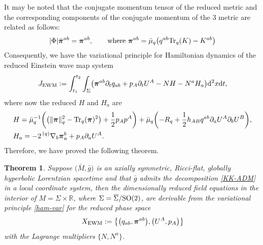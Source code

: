 \documentclass[11pt]{article}
\numberwithin{equation}{section}
\def\ptl{\partial}%
\def\mbo#1{\boldsymbol{#1}}%
\def\olin#1{\overline{#1}{}}%
\def\grad{{\nabla}}%
\newcommand{\leftexp}[2]{{\vphantom{#2}}^{#1}{#2}}
\def\halb{\frac{1}{2}}%
\numberwithin{equation}{section}
\newtheorem{Theorem}{Theorem}[section]
\begin{document}
It may be noted that the conjugate momentum tensor of the reduced metric and the corresponding components of the conjugate momentum of the $3$ metric are related as follows:
\begin{align*}
 \vert \Phi \vert \bar{\mbo{\pi}}^{ab} = \mbo{\pi}^{ab}, \qquad \text{where} \ \mbo{\pi}^{ab} = \bar{\mu}_q \bigl(q^{ab} {\rm Tr}_q(K) - K^{ab} \bigr)
\end{align*}
Consequently, we have the variational principle for Hamiltonian dynamics of the reduced Einstein wave map system
\begin{align} \label{ham-var}
J_{{\rm EWM}} := \int^{t_2}_{t_1}\int_{\Sigma} \bigl(\mbo{\pi}^{ab} \ptl_t q_{ab} + p_A \ptl_t U^A - N H - N^a H_a \bigr) {\rm d}^2x {\rm d}t,
\end{align}
where now the reduced $H$ and $H_a$ are
\begin{align*}
&H= \bar{\mu}^{-1}_q \biggl(\bigl(\Vert \mbo{\pi} \Vert^2_q - {\rm Tr}_q (\mbo{\pi})^2 \bigr) + \halb p_A p^A \biggr) + \bar{\mu}_q \biggl(- R_q + \halb h_{AB} q^{ab} \ptl_a U^A \ptl_b U^B \biggr), \\
&H_a= - 2\, \leftexp{(q)}{\grad}_b \mbo{\pi}^b_a + p_A \ptl_a U^A.
\end{align*}
Therefore, we have proved the following theorem.

\begin{Theorem}
Suppose $\bigl(\bar{M}, \bar{g}\bigr)$ is an axially symmetric, Ricci-flat, globally hyperbolic Lorentzian spacetime and that $\bar{g}$ admits the decomposition \eqref{KK-ADM} in a local coordinate system, then the dimensionally reduced field equations in the interior of $M = \Sigma \times \mathbb{R}$, where $\Sigma = \olin{\Sigma}/{\rm SO}(2)$, are derivable from the variational principle \eqref{ham-var} for the reduced phase space
\begin{align*}
X_{{\rm EWM}} := \bigl\{ \bigl(q_{ab}, \mbo{\pi}^{ab}\bigr), \bigl(U^A, p_A\bigr) \bigr\}
\end{align*}
with the Lagrange multipliers $\{ N, N^a \}$.
\end{Theorem}
\end{document}
